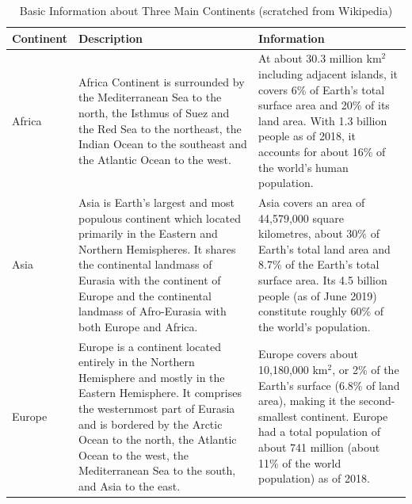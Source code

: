\documentclass[12pt]{ctexart}
\begin{document}
\begin{longtable}{ p{4em} p{14em} p{14em} }
	\caption{Basic Information about Three Main Continents (scratched from Wikipedia)}
	\label{tb:longtable}                                                                                                                      \\
	\toprule
	Continent                                                  & Description                                                    & Information \\
	\midrule
	Africa                                                     & Africa Continent is surrounded by the Mediterranean Sea to the
	north, the Isthmus of Suez and the Red Sea to the northeast, the Indian
	Ocean to the southeast and the Atlantic Ocean to the west. &
	At about 30.3 million km$^2$ including adjacent islands, it covers 6\%
	of Earth's total surface area and 20\% of its land area. With 1.3
	billion people as of 2018, it accounts for about 16\% of the world's
	human population.                                                                                                                         \\
	\midrule
	Asia                                                       & Asia is Earth's largest and most populous continent which
	located primarily in the Eastern and Northern Hemispheres.
	It shares the continental landmass of Eurasia with the continent
	of Europe and the continental landmass of Afro-Eurasia with both
	Europe and Africa.                                         &
	Asia covers an area of 44,579,000 square kilometres, about 30\%
	of Earth's total land area and 8.7\% of the Earth's total surface
	area. Its 4.5 billion people (as of June 2019) constitute roughly
	60\% of the world's population.                                                                                                           \\
	\midrule
	Europe                                                     & Europe is a continent located entirely in the Northern
	Hemisphere and mostly in the Eastern Hemisphere. It comprises the
	westernmost part of Eurasia and is bordered by the Arctic Ocean to
	the north, the Atlantic Ocean to the west, the Mediterranean Sea to
	the south, and Asia to the east.                           &
	Europe covers about 10,180,000 km$^2$, or 2\% of the Earth's surface
	(6.8\% of land area), making it the second-smallest
	continent. Europe had a total population of about 741 million (about
	11\% of the world population) as of 2018.                                                                                                 \\
	\bottomrule
\end{longtable}
\end{document}
